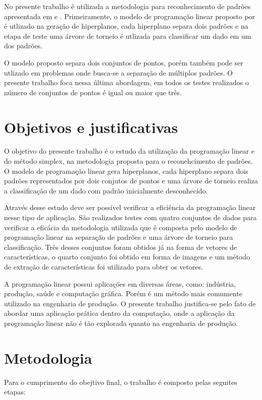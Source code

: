 No presente trabalho é utilizada a metodologia para reconhecimento de padrões apresentada em \cite{Feng} e \cite{Guo}. Primeiramente, o modelo de programação linear proposto por \cite{Bennett92robustlinear} é utlizado na geração de hiperplanos, cada hiperplano separa dois padrões e na etapa de teste uma árvore de torneio é utlizada para classificar um dado em um dos padrões.

O modelo proposto separa dois conjuntos de pontos, porém também pode ser utlizado em problemas onde busca-se a separação de múltiplos padrões. O presente trabalho foca nessa última abordagem, em todos os testes realizados o número de conjuntos de pontos é igual ou maior que três.

\section{Objetivos e justificativas}
O objetivo do presente trabalho é o estudo da utilização da programação linear e do método simplex, na metodologia proposta para o reconehcimento de padrões. O modelo de programação linear gera hiperplanos, cada hiperplano separa dois padrões representados por dois conjutos de pontos e uma árvore de torneio realiza a classificação de um dado com padrão inicialmente desconhecido.

Através desse estudo deve ser possível verificar a eficiência da programação linear nesse tipo de aplicação. São realizados testes com quatro conjuntos de dados para verificar a eficácia da metodologia utilizada que é composta pelo modelo de programação linear na separação de padrões e uma árvore de torneio para classificação. Três desses conjuntos foram obtidos já na forma de vetores de características, o quarto conjunto foi obtido em forma de imagens e um método de extração de características foi utilizado para obter os vetores.

A programação linear possui aplicações em diversas áreas, como: indústria, produção, saúde e computação gráfica. Porém é um método mais comumente utilizado na engenharia de produção. O presente trabalho justifica-se pelo fato de abordar uma aplicação prática dentro da computação, onde a aplicação da programação linear não é tão explorada quanto na engenharia de produção.

\section{Metodologia}
Para o cumprimento do obejtivo final, o trabalho é composto pelas seguites etapas:

